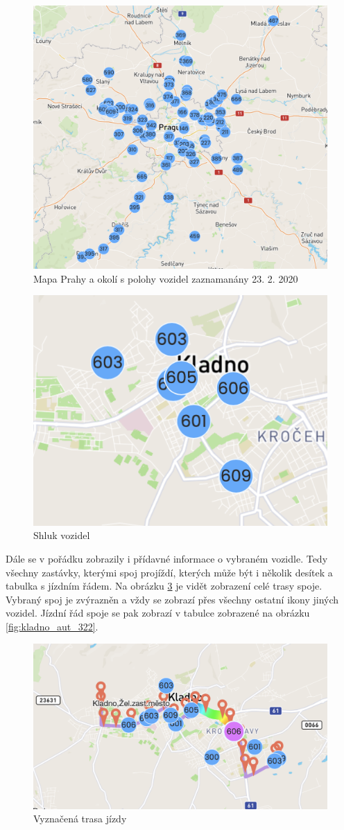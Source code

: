 \begin{figure}
	\centering
  \includegraphics[width=0.7\linewidth]{../img/big_picture.png}
  \caption{Mapa Prahy a okolí s polohy vozidel zaznamanány 23. 2. 2020}
  \label{fig:big_picture}
\end{figure}

\begin{figure}
	\centering
  \includegraphics[width=0.3\linewidth]{../img/cluster.png}
  \caption{Shluk vozidel}
  \label{fig:cluster}
\end{figure}


\bigbreak

Dále se v pořádku zobrazily i přídavné informace o vybraném vozidle. Tedy všechny zastávky, kterými spoj projíždí, kterých může být i několik desítek a tabulka s jízdním řádem. Na obrázku \ref{fig:trip_path} je vidět zobrazení celé trasy spoje. Vybraný spoj je zvýrazněn a vždy se zobrazí přes všechny ostatní ikony jiných vozidel. Jízdní řád spoje se pak zobrazí v tabulce zobrazené na obrázku \ref{fig:kladno_aut_322}.

\begin{figure}
	\centering
  \includegraphics[width=0.7\linewidth]{../img/trip_path.png}
  \caption{Vyznačená trasa jízdy}
  \label{fig:trip_path}
\end{figure}

